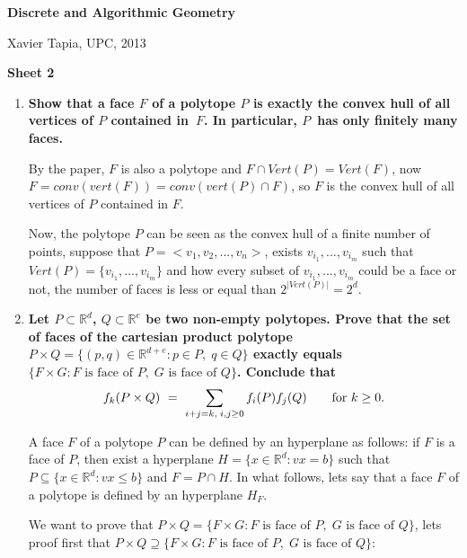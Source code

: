 \documentclass[11pt]{amsart}
\newcommand{\R}{\mathbb{R}}
\begin{document}
\begin{center}
\textbf{\sffamily
   Discrete and Algorithmic Geometry }

\medskip
   Xavier Tapia,
   UPC, 2013 \mbox{}
\end{center}

\bigskip

\begin{center}
  \textbf{\sffamily Sheet 2}

\end{center}

\bigskip


\begin{enumerate}

\item \textbf{Show that a face $F$ of a polytope $P$ is exactly the convex hull of all vertices of $P$ contained in~$F$. 
In particular, $P$~has only finitely many faces.}

By the paper, $F$ is also a polytope and $F \cap Vert(P)=Vert(F)$, now $F=conv(vert(F))=conv(vert(P)\cap F)$, so $F$ is the convex hull of all vertices of $P$ contained in $F$.

Now, the polytope $P$ can be seen as the convex hull of a finite number of points, suppose that $P=<v_1,v_2,...,v_n>$, exists $v_{i_1},...,v_{i_m}$ such that $Vert(P)=\{v_{i_1},...,v_{i_m}\}$ and how every subset of $v_{i_1},...,v_{i_m}$ could be a face or not, the number of faces is less or equal than $2^{|Vert(P)|}=2^{d}$.

\item \textbf{Let $P\subset\R^d$, $Q\subset\R^e$ be two non-empty polytopes. Prove that the set of faces of the cartesian product polytope $P\times Q=\{(p,q)\in\R^{d+e}:p\in P,\; q\in Q\}$ exactly equals $\{F\times G: F\text{ is face of }P, \;G\text{ is face of }Q\}$. Conclude that
\[
    f_k(P\times Q)
    \ = \
    \sum_{%
      i+j=k,\;i,j\ge0}f_i(P) f_j(Q)
    \qquad
    \text{for } k\ge0.
\]}

A face $F$ of a polytope $P$ can be defined by an hyperplane as follows: if $F$ is a face of $P$, then exist a hyperplane $H=\{x \in \R^{d} : vx=b\}$ such that $P \subseteq \{x \in \R^{d} : vx \leq b\}$ and $F=P \cap H$. In what follows, lets say that a face $F$ of a polytope is defined by an hyperplane $H_F$.

We want to prove that $P\times Q = \{F\times G: F\text{ is face of }P, \;G\text{ is face of }Q\}$, lets proof first that $P\times Q \supseteq \{F\times G: F\text{ is face of }P, \;G\text{ is face of }Q\}$:


\end{enumerate}
\end{document}
